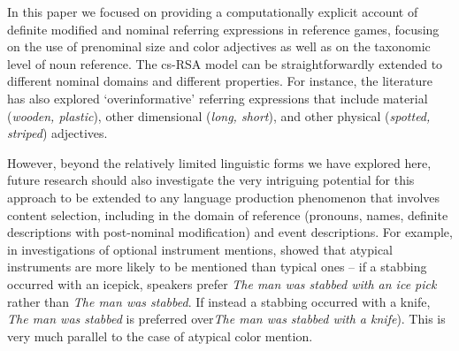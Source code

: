 \documentclass[11pt]{article}
\begin{document}
In this paper we focused on providing a computationally explicit account of definite modified and nominal referring expressions in reference games, focusing on the use of prenominal size and color adjectives as well as on the taxonomic level of noun reference. The cs-RSA model can be straightforwardly extended to different  nominal domains and different properties. For instance, the literature has also explored `overinformative' referring expressions that include material (\emph{wooden, plastic}), other dimensional (\emph{long, short}), and other physical (\emph{spotted, striped}) adjectives. 



However, beyond the relatively limited linguistic forms we have explored here, future research should also investigate the very intriguing potential for this approach to be extended to any language production phenomenon that involves content selection, including in the domain of reference (pronouns, names, definite descriptions with post-nominal modification) and event descriptions. For example, in investigations of optional instrument mentions,  showed that atypical instruments are more likely to be mentioned than typical ones -- if a stabbing occurred with an icepick, speakers prefer \emph{The man was stabbed with an ice pick} rather than \emph{The man was stabbed}. If instead a stabbing occurred with a knife, \emph{The man was stabbed} is preferred over\emph{The man was stabbed with a knife}). This is very much parallel to the case of atypical color mention. %
\end{document}
